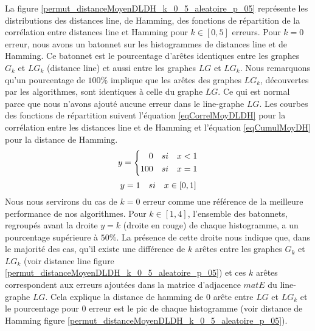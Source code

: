 La figure \ref{permut_distanceMoyenDLDH_k_0_5_aleatoire_p_05} repr\'esente les distributions des distances line, de Hamming, des fonctions de r\'epartition de la corr\'elation entre distances line et Hamming pour $k \in [0,5]$ erreurs. \newline
Pour $k=0$ erreur, nous avons un batonnet sur les histogrammes de distances line et de Hamming. Ce batonnet est le pourcentage d'ar\^etes identiques entre les graphes $G_k$ et $LG_k$ (distance line) et aussi entre les graphes  $LG$ et $LG_k$. Nous remarquons qu'un pourcentage de $100\%$ implique que les ar\^etes des graphes $LG_k$, d\'ecouvertes par les algorithmes, sont identiques \`a celle du graphe $LG$. Ce qui est normal parce que nous n'avons ajout\'e aucune erreur dans le line-graphe $LG$. Les courbes des fonctions de r\'epartition  suivent l'\'equation \ref{eqCorrelMoyDLDH} pour la corr\'elation entre les distances line et de Hamming et l'\'equation \ref{eqCumulMoyDH} pour la distance de Hamming.
\begin{equation}
\label{eqCorrelMoyDLDH}
y = \left\{
	\begin{aligned}
	0 \hspace{1 em} si \hspace{1 em} x < 1 \\
	100  \hspace{1 em}  si  \hspace{1 em}  x = 1
	\end{aligned}
	\right.
\end{equation}
\begin{equation}
\label{eqCumulMoyDH}
y = 1  \hspace{1 em}  si  \hspace{1 em}   x \in [0,1]
\end{equation}
Nous nous servirons du cas de $k=0$ erreur comme une r\'ef\'erence de la meilleure performance de nos algorithmes.
\newline
Pour $k \in [1,4]$, l'ensemble des batonnets, regroup\'es avant la droite $y = k$ (droite en rouge) de chaque histogramme, a un pourcentage sup\'erieure \`a $50 \%$. La pr\'esence de cette droite nous indique que, dans le majorit\'e des cas,  qu'il existe une diff\'erence de $k$ ar\^etes entre les graphes $G_k$ et $LG_k$ (voir distance line figure \ref{permut_distanceMoyenDLDH_k_0_5_aleatoire_p_05}) et ces $k$ ar\^etes correspondent aux erreurs ajout\'ees dans la matrice d'adjacence $matE$ du line-graphe $LG$. Cela explique 
la distance de hamming de $0$ ar\^ete entre $LG$ et $LG_k$ et le pourcentage pour $0$ erreur est le pic de chaque histogramme (voir distance de Hamming figure \ref{permut_distanceMoyenDLDH_k_0_5_aleatoire_p_05}).

